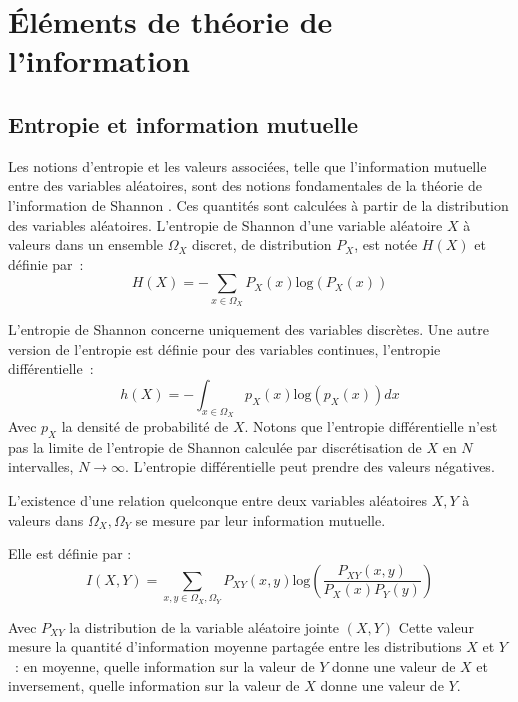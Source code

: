\documentclass[../main]{subfiles}
\begin{document}
\section{\'Eléments de théorie de l'information}

\subsection{Entropie et information mutuelle}

Les notions d'entropie et les valeurs associées, telle que l'information mutuelle entre des variables aléatoires, sont des notions fondamentales de la théorie de l'information de Shannon \parencite{Shannon1948AMT}. Ces quantités sont calculées à partir de la distribution des variables aléatoires.
L'entropie de Shannon d'une variable aléatoire $X$ à valeurs dans un ensemble $\Omega_X$ discret, de distribution $P_X$, est notée $H(X)$ et définie par~: 
\begin{equation}\label{eq:H}
H(X) = - \sum_{x \in \Omega_X}{P_X(x)\textrm{log}(P_X(x))}
\end{equation}

L'entropie de Shannon concerne uniquement des variables discrètes.
Une autre version de l'entropie est définie pour des variables continues, l'entropie différentielle~:
\begin{equation}
    h(X) = - \int_{x \in \Omega_X}{p_X(x)\textrm{log}(p_X(x))dx}
\end{equation}
Avec $p_X$ la densité de probabilité de $X$.
Notons que l'entropie différentielle n'est pas la limite de l'entropie de Shannon calculée par discrétisation de $X$ en $N$ intervalles, $N \rightarrow \infty$. L'entropie différentielle peut prendre des valeurs négatives.

L'existence d'une relation quelconque entre deux variables aléatoires $X,Y$ à valeurs dans $\Omega_X,\Omega_Y$ se mesure par leur information mutuelle.

Elle est définie par : 
\begin{equation}\label{eq:MI}
 I(X,Y) = \sum_{x,y \in \Omega_X,\Omega_Y}{P_{XY}(x,y)\textrm{log}(\frac{P_{XY}(x,y)}{P_X(x)P_Y(y)})}
\end{equation}

Avec $P_{XY}$ la distribution de la variable aléatoire jointe $(X,Y)$
Cette valeur mesure la quantité d'information moyenne partagée entre les distributions $X$ et $Y$~: en moyenne, quelle information sur la valeur de $Y$ donne une valeur de $X$ et inversement, quelle information sur la valeur de $X$ donne une valeur de $Y$.
\end{document}
